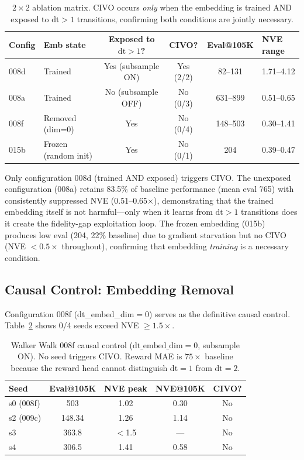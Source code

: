 \documentclass[10pt,letterpaper]{article}
\begin{document}
\begin{table}[h]
\centering
\caption{$2\times 2$ ablation matrix. CIVO occurs \emph{only} when the embedding is trained AND exposed to $\mathrm{dt}>1$ transitions, confirming both conditions are jointly necessary.}
\label{tab:ablation_2x2}
\small
\begin{tabular}{llcccl}
\toprule
Config & Emb state & Exposed to $\mathrm{dt}>1$? & CIVO? & Eval@105K & NVE range \\
\midrule
008d & Trained & Yes (subsample ON) & Yes (2/2) & 82--131 & 1.71--4.12 \\
008a & Trained & No (subsample OFF) & No (0/3) & 631--899 & 0.51--0.65 \\
008f & Removed (dim=0) & Yes & No (0/4) & 148--503 & 0.30--1.41 \\
015b & Frozen (random init) & Yes & No (0/1) & 204 & 0.39--0.47 \\
\bottomrule
\end{tabular}
\end{table}

Only configuration 008d (trained AND exposed) triggers CIVO.
The unexposed configuration (008a) retains 83.5\% of baseline performance (mean eval 765) with consistently suppressed NVE (0.51--0.65$\times$), demonstrating that the trained embedding itself is not harmful---only when it learns from $\mathrm{dt}>1$ transitions does it create the fidelity-gap exploitation loop.
The frozen embedding (015b) produces low eval (204, 22\% baseline) due to gradient starvation but no CIVO (NVE $< 0.5\times$ throughout), confirming that embedding \emph{training} is a necessary condition.

\subsection{Causal Control: Embedding Removal}

Configuration 008f (dt\_embed\_dim$=0$) serves as the definitive causal control.
Table~\ref{tab:walker_008f} shows 0/4 seeds exceed NVE $\geq 1.5\times$.

\begin{table}[h]
\centering
\caption{Walker Walk 008f causal control ($\mathrm{dt\_embed\_dim}=0$, subsample ON). No seed triggers CIVO. Reward MAE is $75\times$ baseline because the reward head cannot distinguish $\mathrm{dt}=1$ from $\mathrm{dt}=2$.}
\label{tab:walker_008f}
\small
\begin{tabular}{lcccc}
\toprule
Seed & Eval@105K & NVE peak & NVE@105K & CIVO? \\
\midrule
s0 (008f) & 503 & 1.02 & 0.30 & No \\
s2 (009c) & 148.34 & 1.26 & 1.14 & No \\
s3 & 363.8 & $<$1.5 & --- & No \\
s4 & 306.5 & 1.41 & 0.58 & No \\
\bottomrule
\end{tabular}
\end{table}
\end{document}
